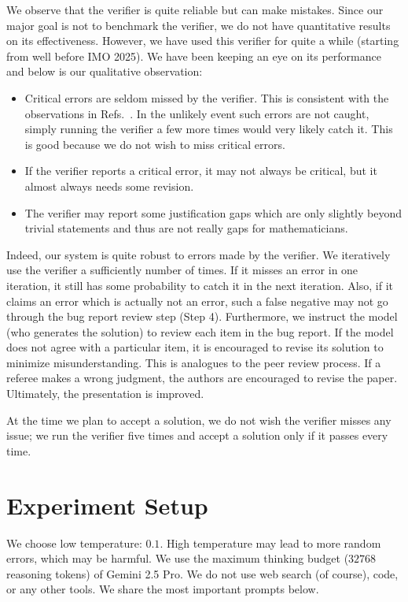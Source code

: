 We observe that the verifier is quite reliable but can make mistakes. Since our major goal is not to benchmark the verifier, we do not have quantitative results on its effectiveness. However, we have used this verifier for quite a while (starting from well before IMO 2025). We have been keeping an eye on its performance and below is our qualitative observation:
\begin{itemize}
    \item Critical errors are seldom missed by the verifier. This is consistent with the observations in Refs.~\cite{SLJ15,guo2025temporal}. In the unlikely event such errors are not caught, simply running the verifier a few more times would very likely catch it. This is good because we do not wish to miss critical errors.
    \item If the verifier reports a critical error, it may not always be critical, but it almost always needs some revision.
    \item The verifier may report some justification gaps which are only slightly beyond trivial statements and thus are not really gaps for mathematicians.
\end{itemize}
Indeed, our system is quite robust to errors made by the verifier. We iteratively use the verifier a sufficiently number of times. If it misses an error in one iteration, it still has some probability to catch it in the next iteration. Also, if it claims an error which is actually not an error, such a false negative may not go through the bug report review step (Step 4). Furthermore, we instruct the model (who generates the solution) to review each item in the bug report. If the model does not agree with a particular item, it is encouraged to revise its solution to minimize misunderstanding. This is analogues to the peer review process. If a referee makes a wrong judgment, the authors are encouraged to revise the paper. Ultimately, the presentation is improved.

At the time we plan to accept a solution, we do not wish the verifier misses any issue; we run the verifier five times and accept a solution only if it passes every time.

\section{Experiment Setup}
We choose low temperature: $0.1$. High temperature may lead to more random errors, which may be harmful. We use the maximum thinking budget ($32768$ reasoning tokens) of Gemini 2.5 Pro. We do not use web search (of course), code, or any other tools. We share the most important prompts below.

